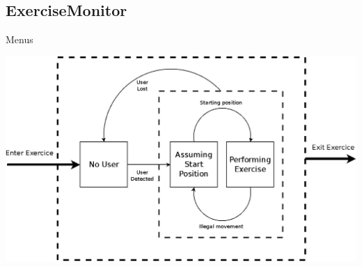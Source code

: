 \subsection{ExerciseMonitor}
\begin{frame}{Menus}
\begin{center}
\includegraphics[width=1.0\linewidth]{../images/exercise_monitor}
\end{center}
\end{frame}

